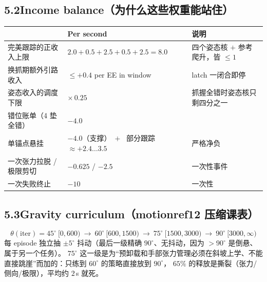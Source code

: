 \documentclass[11pt]{article}
\begin{document}
\subsection*{5.2\quad Income balance（为什么这些权重能站住）}
\begin{center}
\begin{tabular}{@{}lll@{}}
\toprule
& Per second & 说明 \\
\midrule
完美跟踪的正收入上限 & $2.0+0.5+2.5+0.5+2.5 = 8.0$ & 四个姿态核 $+$ 参考爬升，皆 $\le 1$ \\
换抓期额外引路收入 & $\le +0.4$ per EE in window & latch 一闭合即停 \\
姿态收入的调度下限 & $\times\,0.25$ & 抓握全错时姿态核只剩四分之一 \\
错位账单（4 垫全错） & $-4.0$ & \\
单锚点悬挂 & $-4.0$（支撑）$\;+\;$ 部分跟踪 $\approx +2.4\ldots3.5$ & 严格净负 \\
一次张力拉脱 / 极限剪切 & $-0.625$ / $-2.5$ & 一次性事件 \\
一次失败终止 & $-10$ & 一次性 \\
\bottomrule
\end{tabular}
\end{center}

\subsection*{5.3\quad Gravity curriculum（motionref12 压缩课表）}
\[
\theta(\text{iter}) = 45^\circ\ [0,600)\ \longrightarrow\ 60^\circ\ [600,1500)\ \longrightarrow\ 75^\circ\ [1500,3000)\ \longrightarrow\ 90^\circ\ [3000,\infty)
\]
每 episode 独立抽 $\pm5^\circ$ 抖动（最后一级精确 $90^\circ$、无抖动，因为 $>90^\circ$ 是倒悬、属于另一个任务）。
$75^\circ$ 这一级是为“预卸载和手部张力管理必须在斜坡上学、不能直接跳崖”而加的：只练到 $60^\circ$ 的策略直接放到 $90^\circ$，
$65\%$ 的释放是撕裂（张力/侧向/极限），平均约 $2$\,s 就死。
\end{document}
